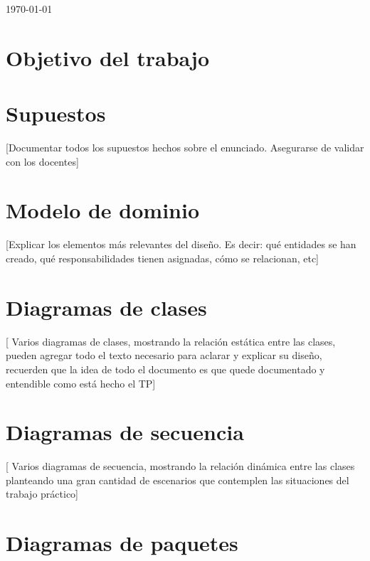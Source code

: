 \begin{titlepage}

	\today

\end{titlepage}

\clearpage
\tableofcontents
\clearpage
\section{Objetivo del trabajo}

\section{Supuestos}

[Documentar todos los supuestos hechos sobre el enunciado. Asegurarse
de validar con los docentes]

\section{Modelo de dominio}

[Explicar los elementos más relevantes del diseño. Es decir: qué
entidades se han creado, qué responsabilidades tienen asignadas, cómo
se relacionan, etc]

\section{Diagramas de clases}

[ Varios diagramas de clases, mostrando la relación estática entre las
clases, pueden agregar todo el texto necesario para aclarar y explicar su
diseño, recuerden que la idea de todo el documento es que quede
documentado y entendible como está hecho el TP]

\section{Diagramas de secuencia}

[ Varios diagramas de secuencia, mostrando la relación dinámica entre las
clases planteando una gran cantidad de escenarios que contemplen las
situaciones del trabajo práctico]

\section{Diagramas de paquetes}

